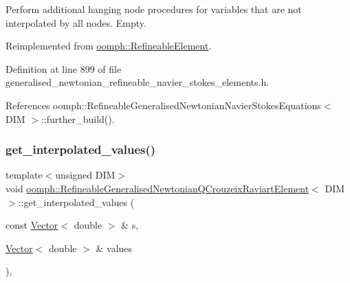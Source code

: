 Perform additional hanging node procedures for variables that are not interpolated by all nodes. Empty. 



Reimplemented from \hyperlink{classoomph_1_1RefineableElement_a86ea01c485f7ff822dce74b884312ccb}{oomph\+::\+Refineable\+Element}.



Definition at line 899 of file generalised\+\_\+newtonian\+\_\+refineable\+\_\+navier\+\_\+stokes\+\_\+elements.\+h.



References oomph\+::\+Refineable\+Generalised\+Newtonian\+Navier\+Stokes\+Equations$<$ D\+I\+M $>$\+::further\+\_\+build().

\mbox{\label{classoomph_1_1RefineableGeneralisedNewtonianQCrouzeixRaviartElement_ad67f1f733c17cbf0da9b1d5429b9fcf0}} 
\subsubsection{\texorpdfstring{get\+\_\+interpolated\+\_\+values()}{get\_interpolated\_values()}\hspace{0.1cm}{\footnotesize\ttfamily [1/2]}}
{\footnotesize\ttfamily template$<$unsigned D\+IM$>$ \\
void \hyperlink{classoomph_1_1RefineableGeneralisedNewtonianQCrouzeixRaviartElement}{oomph\+::\+Refineable\+Generalised\+Newtonian\+Q\+Crouzeix\+Raviart\+Element}$<$ D\+IM $>$\+::get\+\_\+interpolated\+\_\+values (\begin{DoxyParamCaption}\item[{const \hyperlink{classoomph_1_1Vector}{Vector}$<$ double $>$ \&}]{s,  }\item[{\hyperlink{classoomph_1_1Vector}{Vector}$<$ double $>$ \&}]{values }\end{DoxyParamCaption})\hspace{0.3cm}{\ttfamily [inline]}, {\ttfamily [virtual]}}




